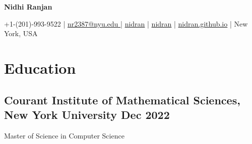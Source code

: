 \documentclass[a4,10pt]{article}
\newcommand{\hskills}[1]{
\textbf{\bfseries #1} }
\begin{document}
\begin{center}
   
 
            \centering
            \textbf{{\LARGE Nidhi Ranjan}} \\ %
            \vspace{0.2cm}
            
            \hspace {0.15cm}\faMobile \hspace {0.15cm} +1-(201)-993-9522  \hspace {0.15cm}| \hspace {0.15cm}
          \href{mailto:\@nr2387@nyu.edu}{\faEnvelope \hspace {0.15cm} nr2387@nyu.edu } \hspace {0.15cm} |  \hspace {0.15cm}
            \href{https://github.com/nidran}{\faGithub  \hspace {0.1cm} nidran}\hspace {0.15cm} | \hspace {0.15cm}  \href{https://www.linkedin.com/in/nidran/}{\faLinkedinSquare  \hspace {0.1cm} nidran} | \hspace {0.15cm} \href{https://nidran.github.io}{\faGlobe \hspace {0.15cm} nidran.github.io} |
  \hspace {0.15cm} \faMapMarker \hspace {0.15cm}  New York, USA\\
            \vspace{0.15cm}
   
    
\vspace{-0.15cm} 
\end{center}

\section{Education }
\subsection*{Courant Institute of Mathematical Sciences, New York University \hfill Dec 2022} 
{Master of Science in Computer Science } 
\vspace{-0.25cm}
\end{document}
